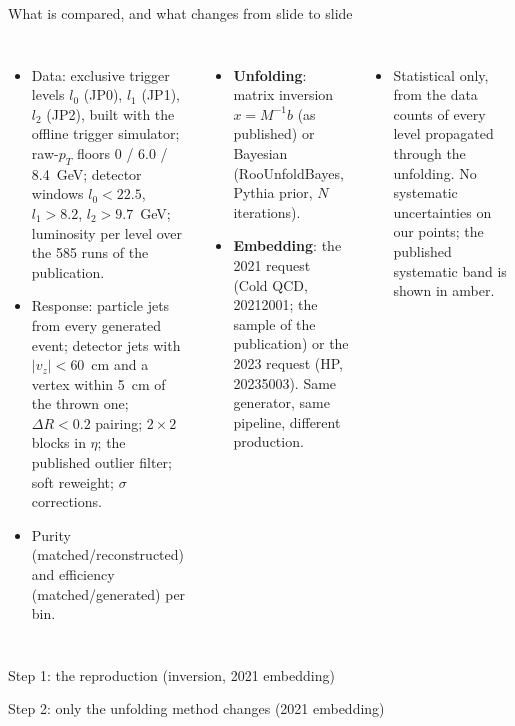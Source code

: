 \begin{frame}{What is compared, and what changes from slide to slide}
\begin{columns}[T]
\begin{itemize}\footnotesize
\item Data: exclusive trigger levels $l_0$ (JP0), $l_1$ (JP1), $l_2$ (JP2), built with the offline trigger simulator; raw-$p_T$ floors 0 / 6.0 / 8.4~GeV; detector windows $l_0<22.5$, $l_1>8.2$, $l_2>9.7$~GeV; luminosity per level over the 585 runs of the publication.
\item Response: particle jets from every generated event; detector jets with $|v_z|<60$~cm and a vertex within 5~cm of the thrown one; $\Delta R<0.2$ pairing; $2\times2$ blocks in $\eta$; the published outlier filter; soft reweight; $\sigma$ corrections.
\item Purity (matched/reconstructed) and efficiency (matched/generated) per bin.
\end{itemize}
\begin{itemize}\footnotesize
\item \textbf{Unfolding}: matrix inversion $x=M^{-1}b$ (as published) or Bayesian (RooUnfoldBayes, Pythia prior, $N$ iterations).
\item \textbf{Embedding}: the 2021 request (Cold QCD, 20212001; the sample of the publication) or the 2023 request (HP, 20235003). Same generator, same pipeline, different production.
\end{itemize}
\begin{itemize}\footnotesize
\item Statistical only, from the data counts of every level propagated through the unfolding. No systematic uncertainties on our points; the published systematic band is shown in amber.
\end{itemize}
\end{columns}
\end{frame}

\begin{frame}{Step 1: the reproduction (inversion, 2021 embedding)}
\end{frame}

\begin{frame}{Step 2: only the unfolding method changes (2021 embedding)}
\end{frame}

